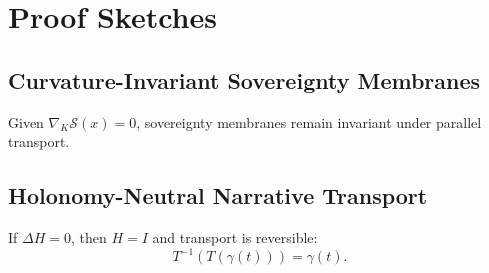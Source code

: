 \section*{Proof Sketches}

\subsection*{Curvature-Invariant Sovereignty Membranes}

Given $\nabla_K \mathcal{S}(x) = 0$, sovereignty membranes remain invariant under
parallel transport.

\subsection*{Holonomy-Neutral Narrative Transport}

If $\Delta H = 0$, then $H = I$ and transport is reversible:
\[
T^{-1}(T(\gamma(t))) = \gamma(t).
\]
